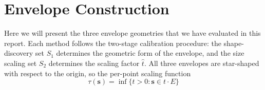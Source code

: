 


\section{Envelope Construction}
\label{sec3.4: envelope construction}
Here we will present the three envelope geometries that we have evaluated in this report. Each method follows the 
two-stage calibration procedure: the shape-discovery set $S_1$ determines the geometric form of the envelope, and the 
size scaling set $S_2$ determines the scaling factor $\hat{t}$. All three envelopes are star-shaped with respect to the origin, 
so the per-point scaling function
\begin{equation}
\label{eq: tau-def}
\tau(\mathbf{s}) = \inf\{t > 0 : \mathbf{s} \in t \cdot E\}
\end{equation}

